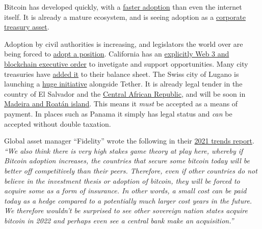 Bitcoin has developed quickly, with a \href{https://phemex.com/blogs/crypto-bitcoin-s-curve-adoption-curve}{faster adoption} than even the internet itself. It is already a mature ecosystem, and is seeing adoption as a \href{https://bitcointreasuries.net/}{corporate treasury asset}. \par
Adoption by civil authorities is increasing, and legislators the world over are being forced to \href{https://www.politico.com/news/2022/01/16/bitcoin-crashes-the-midterms-527126}{adopt a position}. California has an \href{https://www.gov.ca.gov/2022/05/04/governor-newsom-signs-blockchain-executive-order-to-spur-responsible-web3-innovation-grow-jobs-and-protect-consumers/}{explicitly Web 3 and blockchain executive order} to invetigate and support opportunities. Many city treasuries have \href{https://www.bloomberg.com/news/articles/2022-01-14/rio-de-janeiro-wants-to-become-brazil-s-cryptocurrency-capital}{added it} to their balance sheet. The Swiss city of Lugano is launching a \href{https://twitter.com/Stadicus3000/status/1499656424422526977}{huge initiative} alongside Tether. It is already legal tender in the country of El Salvador\cite{oxford2021salvador} and the \href{https://finance.yahoo.com/news/central-african-republic-passes-bill-180910797.html?}{Central African Republic}, and will be soon in \href{https://www.forbes.com/sites/ninabambysheva/2022/04/07/two-new-territories-are-adopting-bitcoin/?sh=7f014ed2499a}{Madeira and Roatán island}. This means it \textit{must} be accepted as a means of payment. In places such as Panama it simply has legal status and \textit{can} be accepted without double taxation.\par 
Global asset manager ``Fidelity'' wrote the following in their \href{https://www.fidelitydigitalassets.com/articles/2021-trends-impact}{2021 trends report}. \textit{``We also think there is very high stakes game theory at play here, whereby if Bitcoin adoption increases, the countries that secure some bitcoin today will be better off competitively than their peers. Therefore, even if other countries do not believe in the investment thesis or adoption of bitcoin, they will be forced to acquire some as a form of insurance. In other words, a small cost can be paid today as a hedge compared to a potentially much larger cost years in the future. We therefore wouldn't be surprised to see other sovereign nation states acquire bitcoin in 2022 and perhaps even see a central bank make an acquisition.''}\par
